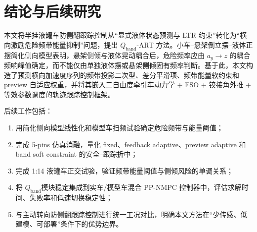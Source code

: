 \documentclass[UTF8,zihao=-4]{ctexrep}
\newcommand{\Qband}{$Q_{\mathrm{band}}$}
\newcommand{\ay}{a_y}
\begin{document}
\chapter{结论与后续研究}
本文将半挂液罐车防侧翻跟踪控制从“显式液体状态预测与 LTR 约束”转化为“横向激励危险频带能量抑制”问题，提出 \Qband-ART 方法。小车--悬架倒立摆--液体正摆简化侧向模型表明，悬架侧倾与液体晃动耦合后，危险频率应由 $\ay\rightarrow z$ 的耦合频响峰值确定，而不能仅由单独液体摆或悬架侧倾固有频率判断。基于此，本文构造了预测横向加速度序列的频带投影二次型、差分平滑项、频带能量软约束和 preview 自适应权重，并将其嵌入二自由度牵引车动力学 + ESO + 铰接角外推 + 等效参数调度的轨迹跟踪控制框架。

后续工作包括：
\begin{enumerate}[label=(\arabic*)]
  \item 用简化侧向模型线性化和模型车扫频试验确定危险频带与能量阈值；
  \item 完成 5-pins 仿真消融，量化 fixed、feedback adaptive、preview adaptive 和 band soft constraint 的安全--跟踪折中；
  \item 完成 1:14 液罐车正交试验，验证频带能量阈值与侧倾风险的单调关系；
  \item 将 \Qband 模块稳定集成到实车/模型车混合 PP-NMPC 控制器中，评估求解时间、失败率和低速切换稳定性；
  \item 与主动转向防侧翻跟踪控制进行统一工况对比，明确本文方法在“少传感、低建模、可部署”条件下的优势边界。
\end{enumerate}

\printbibliography[heading=bibintoc,title={参考文献}]
\end{document}
